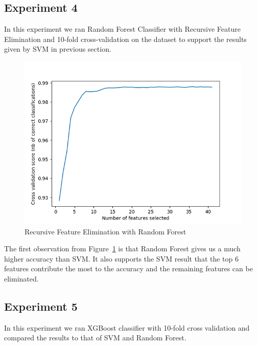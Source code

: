 \subsection{Experiment 4}

In this experiment we ran Random Forest Classifier with Recursive Feature Elimination and 10-fold cross-validation on the dataset to support the results given by SVM in previous section.

\begin{figure}[htb]
	\centering
	\includegraphics[width=1\textwidth]{images/rf_rfe.png}
	\caption{Recursive Feature Elimination with Random Forest} 
	\label{fig:result_rf_rfe}
\end{figure}

The first observation from Figure~\ref{fig:result_rf_rfe} is that Random Forest gives us a much higher accuracy than SVM. It also supports the SVM result that the top 6 features contribute the most to the accuracy and the remaining features can be eliminated.

\subsection{Experiment 5}

In this experiment we ran XGBoost classifier with 10-fold cross validation and compared the results to that of SVM and Random Forest.

